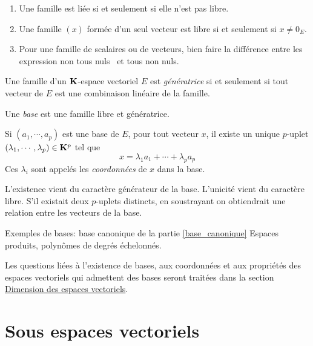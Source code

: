 \begin{rems}
\begin{enumerate}
  \item Une famille est liée si et seulement si elle n'est pas libre.
  \item Une famille $(x)$ formée d'un seul vecteur est libre si et seulement si $x\neq 0_E$.
  \item Pour une famille de scalaires ou de vecteurs, bien faire la différence entre les expression \og non tous nuls\fg~ et \og tous non nuls\fg.
\end{enumerate}
\end{rems}
\begin{defi}
  Une famille d'un $\mathbf{K}$-espace vectoriel $E$ est \emph{génératrice} si et seulement si tout vecteur de $E$ est une combinaison linéaire de la famille.
\end{defi}
\begin{defi}[Base]
Une \emph{base} est une famille libre et génératrice.  
\end{defi}
\begin{prop}
  Si $(a_1,\cdots,a_p)$ est une base de $E$, pour tout vecteur $x$, il existe un unique $p$-uplet $(\lambda_1,\cdots,\lambda_p)\in \mathbf{K}^p$ tel que
\begin{displaymath}
  x = \lambda_1 a_1 + \cdots + \lambda_p a_p
\end{displaymath}
Ces $\lambda_i$ sont appelés les \emph{coordonnées} de $x$ dans la base.
\end{prop}
\begin{demo}
L'existence vient du caractère générateur de la base. L'unicité vient du caractère libre. S'il existait deux $p$-uplets distincts, en soustrayant on obtiendrait une relation entre les vecteurs de la base.  
\end{demo}
Exemples de bases: base canonique  de la partie \ref{base_canonique} Espaces produits, polynômes de degrés échelonnés.

Les questions liées à l'existence de bases, aux coordonnées et aux propriétés des espaces vectoriels qui admettent des bases seront traitées dans la section \href{\baseurl C2112.pdf}{Dimension des espaces vectoriels}.


\section{Sous espaces vectoriels}
